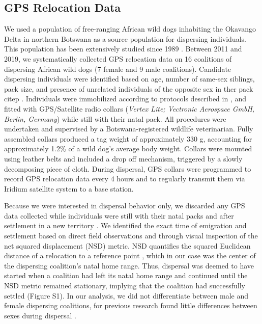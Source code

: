\documentclass[abstract=on,10pt,a4paper,bibliography=totocnumbered]{article}
\begin{document}
\subsection{GPS Relocation Data}
We used a population of free-ranging African wild dogs inhabiting the Okavango
Delta in northern Botswana as a source population for dispersing individuals.
This population has been extensively studied since 1989 \citep{McNutt.1996,
Cozzi.2013, Cozzi.2020, Behr.2020}. Between 2011 and 2019, we systematically
collected GPS relocation data on 16 coalitions of dispersing African wild dogs
(7 female and 9 male coalitions). Candidate dispersing individuals were
identified based on age, number of same‐sex siblings, pack size, and presence of
unrelated individuals of the opposite sex in ther pack citep \citep{McNutt.1996,
Behr.2020}. Individuals were immobilized
according to protocols described in \cite{Osofsky.1996}, and fitted with
GPS/Satellite radio collars (\textit{Vertex Lite; Vectronic Aerospace GmbH,
Berlin, Germany}) while still with their natal pack. All procedures were
undertaken and supervised by a Botswana-registered wildlife veterinarian. Fully
assembled collars produced a tag weight of approximately 330 g, accounting for
approximately 1.2\% of a wild dog's average body weight. Collars were mounted
using leather belts and included a drop off mechanism, triggered by a slowly
decomposing piece of cloth.
During dispersal, GPS collars were programmed to record GPS relocation data
every 4 hours and to regularly transmit them via Iridium satellite system to a
base station.

Because we were interested in dispersal behavior only, we discarded any GPS data
collected while individuals were still with their natal packs and after
settlement in a new territory \citep{Cozzi.2020}. We identified the exact time
of emigration and settlement based on direct field observations and through
visual inspection of the net squared displacement (NSD) metric. NSD quantifies
the squared  Euclidean distance of a relocation to a
reference point \citep{Borger.2012}, which in our case was the center of the
dispersing coalition's natal home range. Thus, dispersal was deemed to have
started when a coalition had left its natal home range and continued until the
NSD metric remained stationary, implying that the coalition had successfully
settled (Figure S1). In our analysis, we did not differentiate between male and
female dispersing coalitions, for previous research found little differences
between sexes during dispersal \citep{Woodroffe.2019, Cozzi.2020}.
\end{document}
